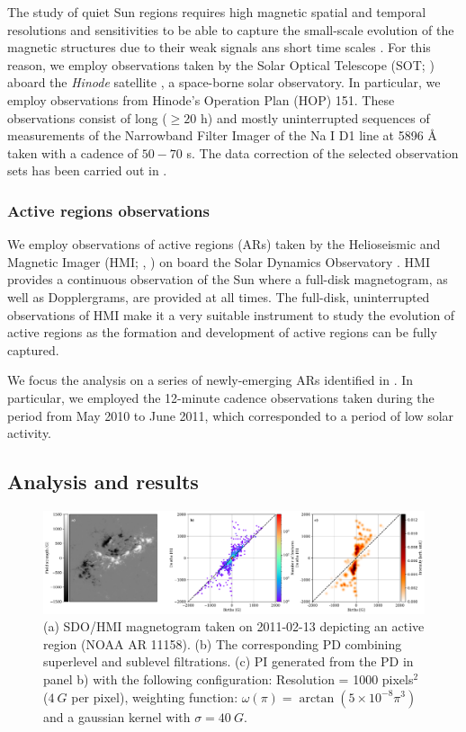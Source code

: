 The study of quiet Sun regions requires high magnetic spatial and temporal resolutions and sensitivities to be able to capture the small-scale evolution of the magnetic structures due to their weak signals ans short time scales \citep{quiet_sun_living_review}. For this reason, we employ observations taken by the Solar Optical Telescope (SOT; \citealt{sot}) aboard the \textit{Hinode} satellite \citep{Hinode}, a space-borne solar observatory. In particular, we employ observations from Hinode's Operation Plan (HOP) 151. These observations consist of long ($\ge 20$ h) and mostly uninterrupted sequences of measurements of the Narrowband Filter Imager of the Na I D1 line at 5896 \r{A} taken with a cadence of $50-70$ s. The data correction of the selected observation sets has been carried out in \citep{gosic}.


\subsubsection{Active regions observations}

We employ observations of active regions (ARs) taken by the Helioseismic and Magnetic Imager (HMI; \citealt{hmi1}, \citealt{hmi2}) on board the Solar Dynamics Observatory \citep{SDO}. HMI provides a continuous observation of the Sun where a full-disk magnetogram, as well as Dopplergrams, are provided at all times. The full-disk, uninterrupted observations of HMI make it a very suitable instrument to study the evolution of active regions as the formation and development of active regions can be fully captured. 

We focus the analysis on a series of newly-emerging ARs identified in \citep{toriumi}. In particular, we employed the 12-minute cadence observations taken during the period from May 2010 to June 2011, which corresponded to a period of low solar activity.

\subsection{Analysis and results}

\begin{figure}
    \centering
     \includegraphics[width=\textwidth]{figures/PersistentHomology/PI_PD_example.pdf}
    \caption{(a) SDO/HMI magnetogram taken on 2011-02-13 depicting an active region (NOAA AR 11158). (b) The corresponding PD combining superlevel and sublevel filtrations. (c) PI generated from the PD in panel b) with the following configuration: Resolution =  1000 pixels$^2$ ($4\ G$ per pixel), weighting function: $\omega (\pi) = \arctan (5\times 10 ^{-8} \pi ^{3})$ and a gaussian kernel with $\sigma = 40\ G$.}
   \label{fig: PD+PI_example}
\end{figure}


